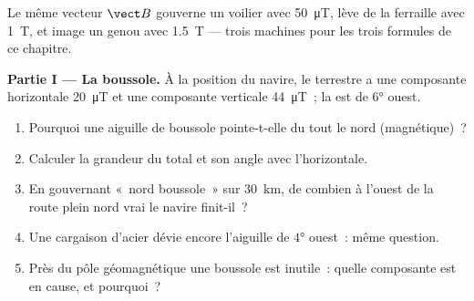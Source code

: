 \begin{problem}
\label{pb:g11:magnetic-fields:1}
Le même vecteur $\vect B$ gouverne un voilier avec \qty{50}{\micro T},
lève de la ferraille avec \qty{1}{T}, et image un genou avec
\qty{1.5}{T} --- trois machines pour les trois formules de ce
chapitre.

\medskip
\noindent\textbf{Partie I --- La boussole.}
À la position du navire, le
 terrestre a une composante
horizontale \qty{20}{\micro T} et une composante verticale
\qty{44}{\micro T}~; la  est de
$\ang{6}$ ouest.
\begin{enumerate}
  \item Pourquoi une aiguille de boussole pointe-t-elle du tout le nord
        (magnétique)~?
  \item Calculer la grandeur du
         total et son angle avec
        l'horizontale.
  \item En gouvernant «~nord boussole~» sur \qty{30}{km}, de combien à
        l'ouest de la route plein nord vrai le navire finit-il~?
  \item Une cargaison d'acier dévie encore l'aiguille de $\ang{4}$
        ouest~: même question.
  \item Près du pôle géomagnétique une boussole est inutile~: quelle
        composante est en cause, et pourquoi~?
\end{enumerate}


\end{problem}
